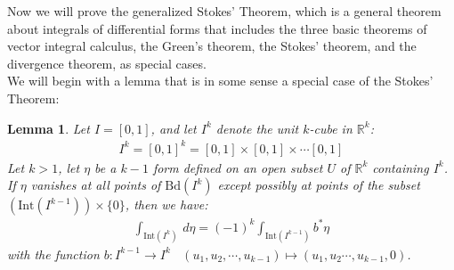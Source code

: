 \documentclass[11pt,oneside]{book}
\theoremstyle{break}
\theoremstyle{break}
\newtheorem{lem}{Lemma}[thm]
\newcommand{\R}{\mathbb{R}}
\newcommand{\Int}{\text{Int}}
\newcommand{\Bd}{\text{Bd}}
\begin{document}
\hfill\break\hfill\break\hfill\break

Now we will prove the generalized Stokes' Theorem, which is a general theorem about integrals of differential forms that includes the three basic theorems of vector integral calculus, the Green's theorem, the Stokes' theorem, and the divergence theorem, as special cases.\\

We will begin with a lemma that is in some sense a special case of the Stokes' Theorem:

\begin{lem}
Let $I = [0,1]$, and let $I^k$ denote the unit $k$-cube in $\R^k$:
\begin{align*}
I^k = [0,1]^k = [0,1]\times [0,1]\times \cdots [0,1]
\end{align*}
Let $k>1$, let $\eta$ be a $k-1$ form defined on an open subset $U$ of $\R^k$ containing $I^k$. If $\eta$ vanishes at all points of $\Bd(I^k)$ except possibly at points of the subset $(\Int(I^{k-1}))\times \{0\}$, then we have:
\begin{align*}
\int_{\Int(I^k)}\, d\eta = (-1)^{k} \int_{\Int(I^{k-1})} b^*\eta \tag{*}
\end{align*}
with the function $b:I^{k-1} \to I^k \ \ \ \ (u_1,u_2,\cdots, u_{k-1}) \mapsto (u_1,u_2\cdots, u_{k-1},0)$. 
\end{lem}
\end{document}
